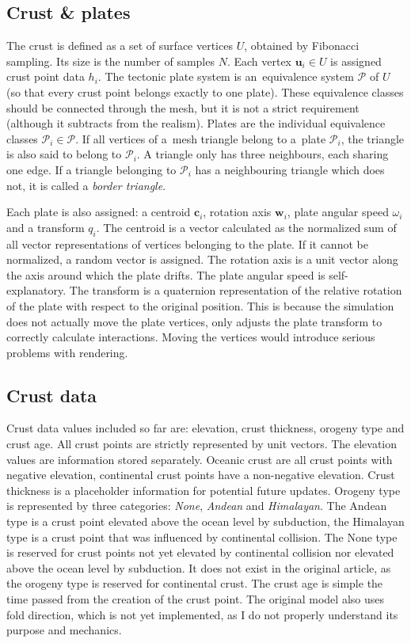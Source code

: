\subsection{Crust \& plates}
The crust is defined as a set of surface vertices $U$, obtained by Fibonacci sampling. Its size is the number of samples $N$. Each vertex $\mathbf{u}_i\in U$ is assigned crust point data $h_i$. The tectonic plate system is an~equivalence system $\mathcal{P}$ of $U$ (so that every crust point belongs exactly to one plate). These equivalence classes should be connected through the mesh, but it is not a strict requirement (although it subtracts from the realism). Plates are the individual equivalence classes $\mathcal{P}_i\in\mathcal{P}$. If all vertices of a~mesh triangle belong to a~plate $\mathcal{P}_i$, the triangle is also said to belong to $\mathcal{P}_i$. A triangle only has three neighbours, each sharing one edge. If a triangle belonging to $\mathcal{P}_i$ has a neighbouring triangle which does not, it is called a \textit{border triangle}.

Each plate is also assigned: a centroid $\mathbf{c}_i$, rotation axis $\mathbf{w}_i$, plate angular speed $\omega_i$ and a transform $q_i$. The centroid is a vector calculated as the normalized sum of all vector representations of vertices belonging to the plate. If it cannot be normalized, a random vector is assigned. The rotation axis is a unit vector along the axis around which the plate drifts. The plate angular speed is self-explanatory. The transform is a quaternion representation of the relative rotation of the plate with respect to the original position. This is because the simulation does not actually move the plate vertices, only adjusts the plate transform to correctly calculate interactions. Moving the vertices would introduce serious problems with rendering.
\subsection{Crust data}
Crust data values included so far are: elevation, crust thickness, orogeny type and crust age. All crust points are strictly represented by unit vectors. The elevation values are information stored separately. Oceanic crust are all crust points with negative elevation, continental crust points have a non-negative elevation. Crust thickness is a placeholder information for potential future updates. Orogeny type is represented by three categories: \textit{None}, \textit{Andean} and \textit{Himalayan}. The Andean type is a crust point elevated above the ocean level by subduction, the Himalayan type is a crust point that was influenced by continental collision. The None type is reserved for crust points not yet elevated by continental collision nor elevated above the ocean level by subduction. It does not exist in the original article, as the orogeny type is reserved for continental crust. The crust age is simple the time passed from the creation of the crust point. The original model also uses fold direction, which is not yet implemented, as I do not properly understand its purpose and mechanics.

